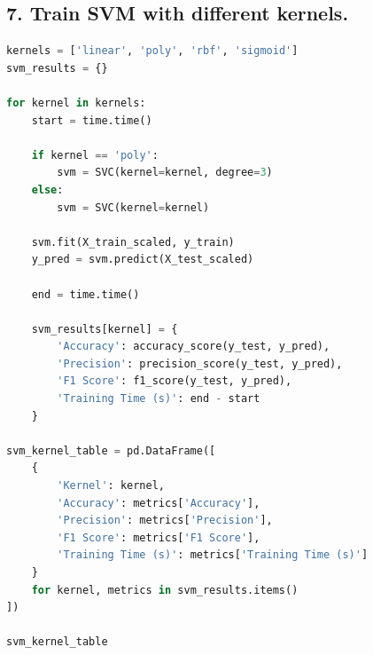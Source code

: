 \documentclass[11pt]{article}
\begin{document}
\subsection*{7. Train SVM with different kernels.}
\begin{lstlisting}[language=Python]
kernels = ['linear', 'poly', 'rbf', 'sigmoid']
svm_results = {}

for kernel in kernels:
    start = time.time()
    
    if kernel == 'poly':
        svm = SVC(kernel=kernel, degree=3)
    else:
        svm = SVC(kernel=kernel)
    
    svm.fit(X_train_scaled, y_train)
    y_pred = svm.predict(X_test_scaled)
    
    end = time.time()
    
    svm_results[kernel] = {
        'Accuracy': accuracy_score(y_test, y_pred),
        'Precision': precision_score(y_test, y_pred),
        'F1 Score': f1_score(y_test, y_pred),
        'Training Time (s)': end - start
    }

svm_kernel_table = pd.DataFrame([
    {
        'Kernel': kernel,
        'Accuracy': metrics['Accuracy'],
        'Precision': metrics['Precision'],
        'F1 Score': metrics['F1 Score'],
        'Training Time (s)': metrics['Training Time (s)']
    }
    for kernel, metrics in svm_results.items()
])

svm_kernel_table

\end{lstlisting}
\end{document}
